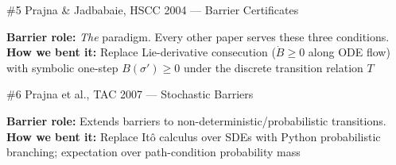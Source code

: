 \documentclass[aspectratio=169]{beamer}
\begin{document}

\begin{frame}{\#5 Prajna \& Jadbabaie, HSCC 2004 --- Barrier Certificates}

\vspace{0.8em}
\textbf{Barrier role:} \emph{The} paradigm. Every other paper serves these three conditions.\\[3pt]
\textbf{How we bent it:} Replace Lie-derivative consecution ($\dot{B} \ge 0$ along ODE flow) with symbolic one-step $B(\sigma') \ge 0$ under the discrete transition relation $T$
\end{frame}

\begin{frame}{\#6 Prajna et al., TAC 2007 --- Stochastic Barriers}

\vspace{0.8em}
\textbf{Barrier role:} Extends barriers to non-deterministic/probabilistic transitions.\\[3pt]
\textbf{How we bent it:} Replace It\^{o} calculus over SDEs with Python probabilistic branching; expectation over path-condition probability mass
\end{frame}
\end{document}

